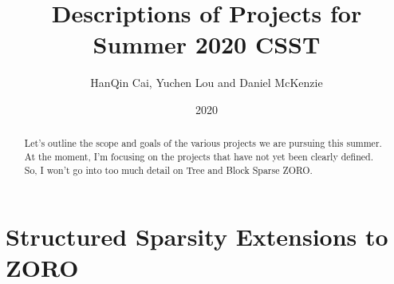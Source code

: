 \documentclass{article}
\title{Descriptions of Projects for Summer 2020 CSST}
\author{HanQin Cai, Yuchen Lou and Daniel McKenzie}
\date{2020}
\begin{document}
\maketitle

\begin{abstract}
Let's outline the scope and goals of the various projects we are pursuing this summer. At the moment, I'm focusing on the projects that have not yet been clearly defined. So, I won't go into too much detail on Tree and Block Sparse ZORO.
\end{abstract}



\section{Structured Sparsity Extensions to ZORO}
\end{document}
